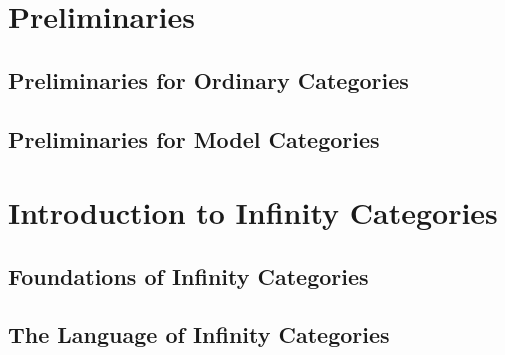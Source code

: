 \documentclass[12pt]{report}
\begin{document}


\setcounter{section}{-1}

\section{Preliminaries}

\subsection{Preliminaries for Ordinary Categories}



\subsection{Preliminaries for Model Categories}



\section{Introduction to Infinity Categories}

\subsection{Foundations of Infinity Categories}



\subsection{The Language of Infinity Categories}


\end{document}
